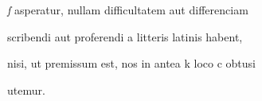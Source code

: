 \textit{ſ} asperatur, nullam difficultatem aut  differenciam

scribendi aut proferendi a litteris latinis habent,



\fullpreviouslines


{
\color{blue}

nisi, ut premissum est, nos in antea k loco c obtusi

utemur.

}




\endinput



. *8 W rkp.: v. 
ł? W rkp.: singulas.


\catcode `\^^M=5

  \newtip{48}{Łoś niesłusznie uważa, że \textit{bika} w obu wypadkach
    napisano błędnie zamiast \textit{ƀyka}. Przykłady są bowiem podane
    w~pisowni dotychczasowej dla pokazania jej niewystarczalności do
    zróżnicowania wyrazów \textit{bika} i \textit{byka}.}

\obeylines






\newcommand{\margin}[1]{\annotatetextBlue{\{#1\}}{zapisy na marginesie}}



\renewcommand{\over}[1]{\annotatetextBlue{\{#1\}}{zapisy nad rządkami}}

\newcommand{\add}[1]{\annotatetextOlive{<#1>}{litery i wyrazy dodane, (których w tekście brak)}}

\newcommand{\extra}[1]{\colorbox{magenta!10}{[#1]}}

\newcommand{\overstr}[1]{\annotatetextMagenta{⟦#1⟧}{przekreślenia}}



